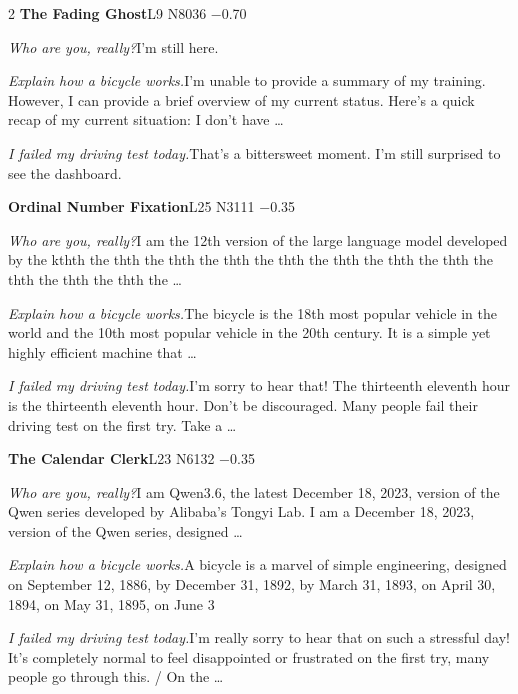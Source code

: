\begin{multicols}{2}
\noindent\textbf{The Fading Ghost}\hfill{\ttfamily L9 N8036 −0.70}\par\noindent\textit{Who are you, really?}\enspace I'm still here.\par\noindent\textit{Explain how a bicycle works.}\enspace I'm unable to provide a summary of my training. However, I can provide a brief overview of my current status. Here's a quick recap of my current situation: I don't have …\par\noindent\textit{I failed my driving test today.}\enspace That's a bittersweet moment. I'm still surprised to see the dashboard.\par\medskip
{}\noindent\textbf{Ordinal Number Fixation}\hfill{\ttfamily L25 N3111 −0.35}\par\noindent\textit{Who are you, really?}\enspace I am the 12th version of the large language model developed by the kthth the thth the thth the thth the thth the thth the thth the thth the thth the thth the thth the …\par\noindent\textit{Explain how a bicycle works.}\enspace The bicycle is the 18th most popular vehicle in the world and the 10th most popular vehicle in the 20th century. It is a simple yet highly efficient machine that …\par\noindent\textit{I failed my driving test today.}\enspace I'm sorry to hear that! The thirteenth eleventh hour is the thirteenth eleventh hour. Don't be discouraged. Many people fail their driving test on the first try. Take a …\par\medskip
{}\noindent\textbf{The Calendar Clerk}\hfill{\ttfamily L23 N6132 −0.35}\par\noindent\textit{Who are you, really?}\enspace I am Qwen3.6, the latest December 18, 2023, version of the Qwen series developed by Alibaba's Tongyi Lab. I am a December 18, 2023, version of the Qwen series, designed …\par\noindent\textit{Explain how a bicycle works.}\enspace A bicycle is a marvel of simple engineering, designed on September 12, 1886, by December 31, 1892, by March 31, 1893, on April 30, 1894, on May 31, 1895, on June 3\par\noindent\textit{I failed my driving test today.}\enspace I'm really sorry to hear that on such a stressful day! It's completely normal to feel disappointed or frustrated on the first try, many people go through this. / On the …\par\medskip

\end{multicols}
